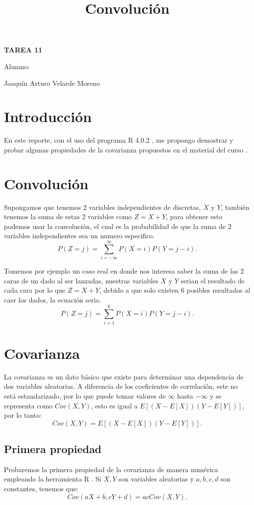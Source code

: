 \documentclass[]{article}
\title{Convolución}
\date{}
\begin{document}
	\maketitle
	\begin{center}


\centerline{\textbf{TAREA 11} } 
\textbf{ }

\centerline{Alumno: } 
\centerline{Joaquín Arturo Velarde Moreno}


	\end{center}
	

\section{Introducción}
En este reporte, con el uso del programa R 4.0.2 \cite{rproject}, me propongo demostrar y probar algunas propiedades de la covarianza propuestos en el material del curso \cite{MaterialClase}.
\section{Convolución}
Supongamos que tenemos 2 variables independientes de discretas, $X$ y $Y$, también tenemos la suma de estas 2 variables como $Z = X + Y$, para obtener esto podemos usar la convolución, el cual es la probabilidad de que la suma de 2 variables independientes sea un numero especifico.
\[P(Z = j) = \sum_{i = -\infty}^{\infty}P(X = i)P(Y = j-i). \]

Tomemos por ejemplo un caso real en donde nos interesa saber la suma de las 2 caras de un dado al ser lanzadas, nuestras variables $X$ y $Y$ serian el resultado de cada cara por lo que $Z = X + Y$, debido a que solo existen 6 posibles resultados al caer los dados, la ecuación seria.
\[P(Z = j) = \sum_{i = 1}^{6}P(X = i)P(Y = j-i). \]


\section{Covarianza}

La covarianza es un dato básico que existe para determinar una dependencia de dos variables aleatorias. A diferencia de los coeficientes de correlación, este no está estandarizado, por lo que puede tomar valores de $\infty$ hasta $-\infty$ y se representa como $Cov(X,Y)$, esto es igual a $E[(X - E[X])(Y - E[Y])]$, por lo tanto:
\[Cov(X,Y) = E[(X - E[X])(Y - E[Y])]. \]
\subsection{Primera propiedad}
Probaremos la primera propiedad de la covarianza de manera numérica empleando la herramienta R \cite{rproject}. Si $X,Y$ son variables aleatorias y $a, b, c, d$ son constantes, tenemos que:
\[Cov(aX + b,cY + d) = acCov(X,Y). \]
\end{document}

